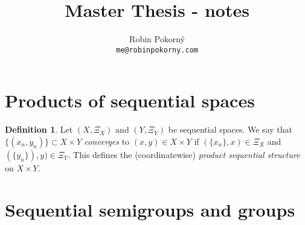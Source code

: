 \documentclass[12pt]{article}
\title{Master Thesis - notes}
\author{Robin Pokorný\\
\small \texttt{me@robinpokorny.com}\\
}
\date{}
\theoremstyle{definition}
\newtheorem{define}[theorem]{Definition}
\theoremstyle{remark}
\begin{document}
\maketitle

\section*{Products of sequential spaces}

\begin{define}\label{def:prodseq}
Let $(X, \Xi_X)$ and $(Y, \Xi_Y)$ be sequential spaces. We say that $\{(x_n, y_n)\}\subset X\times Y$ \emph{converges} to $(x, y)\in X\times Y$ if $(\{x_n\}, x)\in \Xi_X$ and $(\{y_n\}), y)\in \Xi_Y$.
This defines the (coordinatewise) \emph{product sequential structure} on $X\times Y$.
\end{define}

\section*{Sequential semigroups and groups}
\end{document}
